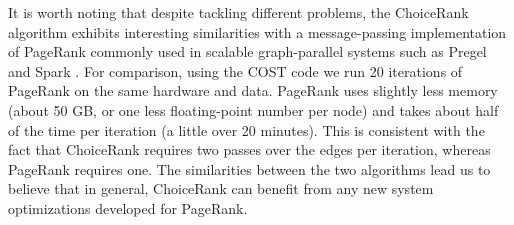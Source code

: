 It is worth noting that despite tackling different problems, the ChoiceRank algorithm exhibits interesting similarities with a message-passing implementation of PageRank commonly used in scalable graph-parallel systems such as Pregel \citep{malewicz2010pregel} and Spark \citep{gonzalez2014graphx}.
For comparison, using the COST code \citep{mcsherry2015scalability} we run \num{20} iterations of PageRank on the same hardware and data.
PageRank uses slightly less memory (about \num{50} GB, or one less floating-point number per node) and takes about half of the time per iteration (a little over \num{20} minutes).
This is consistent with the fact that ChoiceRank requires two passes over the edges per iteration, whereas PageRank requires one.
The similarities between the two algorithms lead us to believe that in general, ChoiceRank can benefit from any new system optimizations developed for PageRank.
